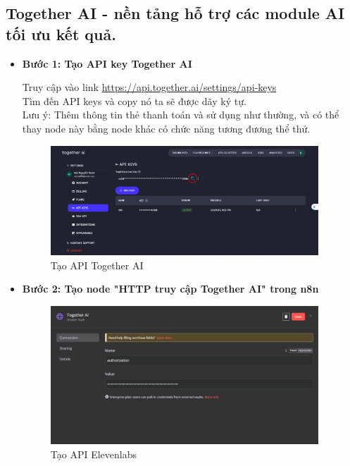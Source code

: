 \subsection{Together AI - nền tảng hỗ trợ các module AI tối ưu kết quả.}
\begin{itemize}[label=]
    \item \textbf{Bước 1: Tạo API key Together AI} 
    
    Truy cập vào link \url{https://api.together.ai/settings/api-keys} \\ 
    Tìm đến API keys và copy nó ta sẽ được dãy ký tự.\\
    Lưu ý: Thêm thông tin thẻ thanh toán và sử dụng như thường, và có thể thay node này bằng node khác có chức năng tương đương thể thử.\\
    
    \begin{figure}[H]
    \centering
    \includegraphics[width=0.95\textwidth]{images/TogetherAI.png}
    \caption{Tạo API Together AI}
    
    \end{figure}
    \item \textbf{Bước 2: Tạo node "HTTP truy cập Together AI" trong n8n}\\
    \begin{figure}[H]
    \centering
    \includegraphics[width=0.95\textwidth]{images/TogetherAI-1.png}
    \caption{Tạo API Elevenlabs}
    

\end{figure}
\end{itemize}
